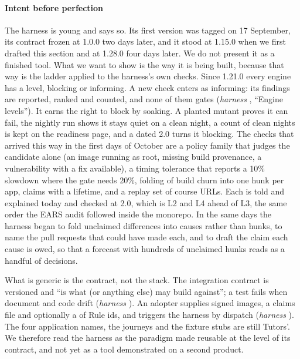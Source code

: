 \paragraph{Intent before perfection} The harness is young and says so. Its first version was
tagged on 17 September, its contract frozen at 1.0.0 two days later, and it stood at 1.15.0 when
we first drafted this section and at 1.28.0 four days later. We do not present it as a finished
tool. What we want to show is the way it is being built, because that way is the ladder applied
to the harness's own checks. Since 1.21.0 every engine has a level, blocking or informing. A new
check enters as informing: its findings are reported, ranked and counted, and none of them gates
(\emph{harness} , ``Engine levels''). It earns the right to block by
soaking. A planted mutant proves it can fail, the nightly run shows it stays quiet on a clean
night, a count of clean nights is kept on the readiness page, and a dated 2.0 turns it blocking.
The checks that arrived this way in the first days of October are a policy family that judges
the candidate alone (an image running as root, missing build provenance, a vulnerability with a
fix available), a timing tolerance that reports a 10\% slowdown where the gate needs 20\%,
folding of build churn into one hunk per app, claims with a lifetime, and a replay set of course
URLs. Each is told and explained today and checked at 2.0, which is L2 and L4 ahead of L3, the
same order the EARS audit followed inside the monorepo. In the same days the harness began to
fold unclaimed differences into causes rather than hunks, to name the pull requests that could
have made each, and to draft the claim each cause is owed, so that a forecast with hundreds of
unclaimed hunks reads as a handful of decisions.

What is generic is the contract, not the stack. The integration contract is versioned and
``is what  (or anything else) may build against''; a test fails
when document and code drift (\emph{harness} ). An adopter supplies signed
images, a claims file and optionally a  of Rule ids, and triggers the harness by
dispatch (\emph{harness} ). The four application names, the
journeys and the fixture stubs are still Tutors'. We therefore read the harness as the paradigm
made reusable at the level of its contract, and not yet as a tool demonstrated on a second
product.

